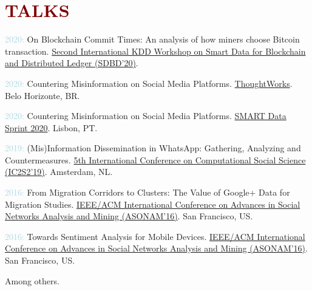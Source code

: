 
\section*{\textcolor{maroon}{\normalsize TALKS}} 

\begin{innerlist}[-]
    \item \textcolor{lightblue}{2020:} On Blockchain Commit Times: An analysis of how miners choose Bitcoin transaction. \href{https://youtu.be/o_KZpNPJQiE}{Second International KDD Workshop on Smart Data for Blockchain and Distributed Ledger (SDBD'20)}.
    \item \textcolor{lightblue}{2020:} Countering Misinformation on Social Media Platforms. \href{https://www.thoughtworks.com/locations/brasil/}{ThoughtWorks}. Belo Horizonte, BR.
    \item \textcolor{lightblue}{2020:} Countering Misinformation on Social Media Platforms. \href{https://smart.inovamedialab.org/2020-digital-methods/theme/}{SMART Data Sprint 2020}. Lisbon, PT.
    \item \textcolor{lightblue}{2019:} (Mis)Information Dissemination in WhatsApp: Gathering, Analyzing and Countermeasures. \href{https://2019.ic2s2.org/oral-presentations/}{5th International Conference on Computational Social Science (IC2S2'19)}. Amsterdam, NL.
    \item \textcolor{lightblue}{2016:} From Migration Corridors to Clusters: The Value of Google+ Data for Migration Studies. \href{http://asonam.cpsc.ucalgary.ca/2016/}{IEEE/ACM International Conference on Advances in Social Networks Analysis and Mining (ASONAM'16)}. San Francisco, US.
    \item \textcolor{lightblue}{2016:} Towards Sentiment Analysis for Mobile Devices. \href{http://asonam.cpsc.ucalgary.ca/2016/}{IEEE/ACM International Conference on Advances in Social Networks Analysis and Mining (ASONAM'16)}. San Francisco, US.
    \item Among others.
\end{innerlist}


